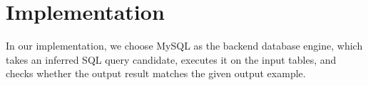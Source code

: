 
\section{Implementation}
\label{sec:implementation}



In our implementation, we choose MySQL as the backend database engine, which takes an
inferred SQL query candidate, executes it on the input tables, and checks whether the
output result matches the given output example.

